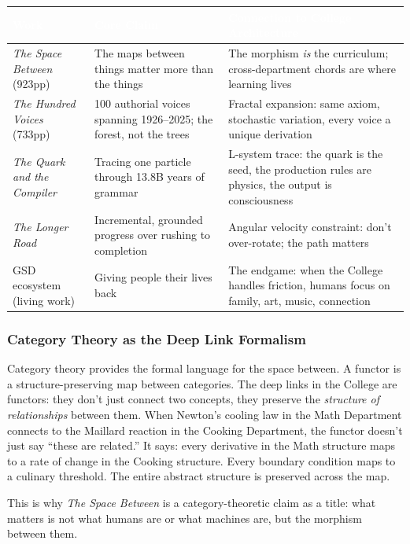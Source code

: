 \documentclass[11pt,letterpaper]{article}
\newcommand{\tableheader}[1]{\textbf{\sffamily\textcolor{white}{#1}}}
\begin{document}
\begin{center}
\begin{tabularx}{\textwidth}{L{4.5cm}L{3cm}X}
\toprule
{}
\tableheader{Work} & \tableheader{Core Claim} & \tableheader{Connection to College Architecture} \\
\midrule
\textit{The Space Between} (923pp) & The maps between things matter more than the things & The morphism \textit{is} the curriculum; cross-department chords are where learning lives \\
\textit{The Hundred Voices} (733pp) & 100 authorial voices spanning 1926--2025; the forest, not the trees & Fractal expansion: same axiom, stochastic variation, every voice a unique derivation \\
\textit{The Quark and the Compiler} & Tracing one particle through 13.8B years of grammar & L-system trace: the quark is the seed, the production rules are physics, the output is consciousness \\
\textit{The Longer Road} & Incremental, grounded progress over rushing to completion & Angular velocity constraint: don't over-rotate; the path matters \\
GSD ecosystem (living work) & Giving people their lives back & The endgame: when the College handles friction, humans focus on family, art, music, connection \\
\bottomrule
\end{tabularx}
\end{center}

\subsubsection{Category Theory as the Deep Link Formalism}

Category theory provides the formal language for the space between. A functor is a structure-preserving
map between categories. The deep links in the College are functors: they don't just connect two
concepts, they preserve the \textit{structure of relationships} between them. When Newton's
cooling law in the Math Department connects to the Maillard reaction in the Cooking Department,
the functor doesn't just say ``these are related.'' It says: every derivative in the Math structure
maps to a rate of change in the Cooking structure. Every boundary condition maps to a culinary
threshold. The entire abstract structure is preserved across the map.

This is why \textit{The Space Between} is a category-theoretic claim as a title: what matters is
not what humans are or what machines are, but the morphism between them.
\end{document}
